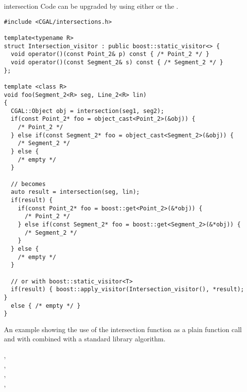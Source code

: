 \begin{ccRefFunction}{intersection}
Code can be upgraded by using either  or the
.

\ccHtmlLinksOff%
\begin{verbatim}
#include <CGAL/intersections.h>

template<typename R>
struct Intersection_visitor : public boost::static_visitor<> {
  void operator()(const Point_2& p) const { /* Point_2 */ }
  void operator()(const Segment_2& s) const { /* Segment_2 */ }
};

template <class R>
void foo(Segment_2<R> seg, Line_2<R> lin)
{
  CGAL::Object obj = intersection(seg1, seg2);
  if(const Point_2* foo = object_cast<Point_2>(&obj)) {
    /* Point_2 */
  } else if(const Segment_2* foo = object_cast<Segment_2>(&obj)) {
    /* Segment_2 */
  } else {
    /* empty */
  }

  // becomes
  auto result = intersection(seg, lin);
  if(result) {
    if(const Point_2* foo = boost::get<Point_2>(&*obj)) {
      /* Point_2 */
    } else if(const Segment_2* foo = boost::get<Segment_2>(&*obj)) {
      /* Segment_2 */
    }
  } else {
    /* empty */
  }

  // or with boost::static_visitor<T>
  if(result) { boost::apply_visitor(Intersection_visitor(), *result); } 
  else { /* empty */ }
}
\end{verbatim}%
\ccHtmlLinksOn%

\ccExample

An example showing the use of the intersection function as a plain function call and with  combined with a standard library algorithm.


\ccSeeAlso
{}, \\
, \\
, \\
, \\

\end{ccRefFunction}
